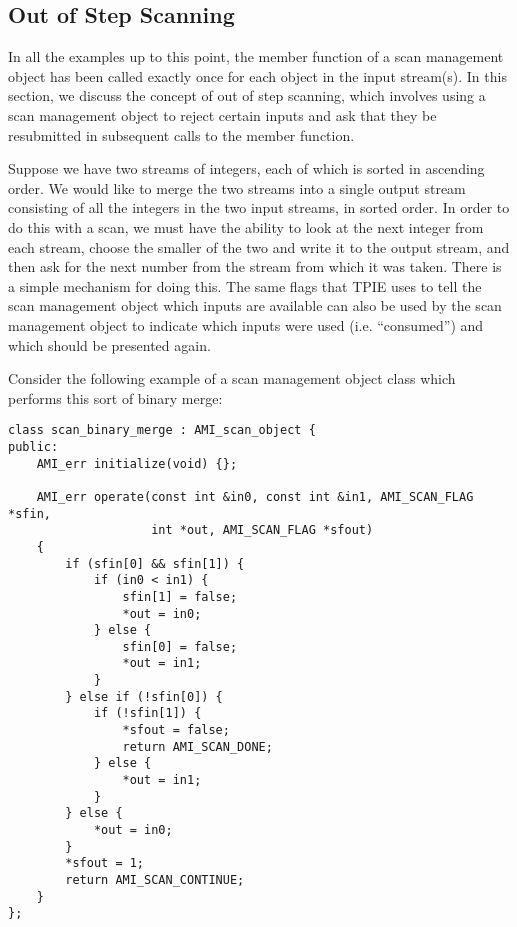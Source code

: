 \subsection{Out of Step Scanning}

In all the examples up to this point, the
 member function of a scan management object has been
called exactly once for each object in the input stream(s).  In this
section, we discuss the concept of out of step scanning,
which involves using a scan management object to reject certain inputs and ask that
they be resubmitted in subsequent calls to the  member
function.

Suppose we have two streams of integers, each of which is
sorted in ascending order.  We would like to merge the two streams
into a single output stream consisting of all the integers in the two
input streams, in sorted order.  In order to do this with a scan, we
must have the ability to look at the next integer from each stream,
choose the smaller of the two and write it to the output stream, and
then ask for the next number from the stream from which it was taken.
There is a simple mechanism for doing this.  The same flags
that TPIE uses to tell the scan management object which inputs are
available can also be used by the scan management object to indicate which
inputs were used (i.e. ``consumed'') and which should be presented again.

Consider the following example of a scan management object class which
performs this sort of binary
merge:

\begin{verbatim}
class scan_binary_merge : AMI_scan_object {
public:
    AMI_err initialize(void) {};
    
    AMI_err operate(const int &in0, const int &in1, AMI_SCAN_FLAG *sfin,
                    int *out, AMI_SCAN_FLAG *sfout) 
    {
        if (sfin[0] && sfin[1]) {
            if (in0 < in1) {
                sfin[1] = false;
                *out = in0;
            } else {
                sfin[0] = false;
                *out = in1;
            }
        } else if (!sfin[0]) {
            if (!sfin[1]) {
                *sfout = false;
                return AMI_SCAN_DONE;
            } else {
                *out = in1;
            }
        } else {
            *out = in0;
        }
        *sfout = 1;
        return AMI_SCAN_CONTINUE;
    }
};
\end{verbatim}

